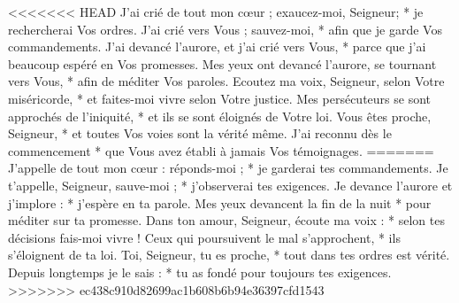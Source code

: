 <<<<<<< HEAD
J'ai crié de tout mon cœur ; exaucez-moi, Seigneur; * je rechercherai Vos ordres.
\versseparator
J'ai crié vers Vous ; sauvez-moi, * afin que je garde Vos commandements.
\versseparator
J'ai devancé l'aurore, et j'ai crié vers Vous, * parce que j'ai beaucoup espéré en Vos promesses.
\versseparator
Mes yeux ont devancé l'aurore, se tournant vers Vous, * afin de méditer Vos paroles.
\versseparator
Ecoutez ma voix, Seigneur, selon Votre miséricorde, * et faites-moi vivre selon Votre justice.
\versseparator
Mes persécuteurs se sont approchés de l'iniquité, * et ils se sont éloignés de Votre loi.
\versseparator
Vous êtes proche, Seigneur, * et toutes Vos voies sont la vérité même.
\versseparator
J'ai reconnu dès le commencement * que Vous avez établi à jamais Vos témoignages.
=======
J’appelle de tout mon cœur : réponds-moi ; *
je garderai tes commandements.
\versseparator
Je t’appelle, Seigneur, sauve-moi ; *
j’observerai tes exigences.
\versseparator
Je devance l’aurore et j’implore : *
j’espère en ta parole.
\versseparator
Mes yeux devancent la fin de la nuit *
pour méditer sur ta promesse.
\versseparator
Dans ton amour, Seigneur, écoute ma voix : *
selon tes décisions fais-moi vivre !
\versseparator
Ceux qui poursuivent le mal s’approchent, *
ils s’éloignent de ta loi.
\versseparator
Toi, Seigneur, tu es proche, *
tout dans tes ordres est vérité.
\versseparator
Depuis longtemps je le sais : *
tu as fondé pour toujours tes exigences.
>>>>>>> ec438c910d82699ac1b608b6b94e36397cfd1543
